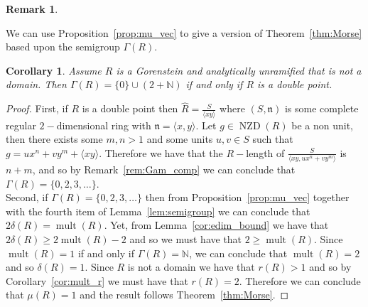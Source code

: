 \documentclass{article}
\newtheorem{remark}[theorem]{Remark}
\newtheorem{corollary}[theorem]{Corollary}
\DeclareMathOperator{\NZD}{NZD}
\DeclareMathOperator{\mult}{mult}
\numberwithin{theorem}{section}
\begin{document}
\begin{remark}
\end{remark}

We can use Proposition~\ref{prop:mu_vec} to give a version of Theorem~\ref{thm:Morse} based upon the semigroup $\Gamma(R)$. 

\begin{corollary}\label{cor:A_1_Gamma}
    Assume $R$ is a Gorenstein and analytically unramified that is not a domain. Then $\Gamma(R) = \{0\} \cup (2 + \mathbb{N})$ if and only if $R$ is a double point.
\end{corollary}

\begin{proof}
    First, if $R$ is a double point then $\hat{R} = \frac{S}{\langle xy \rangle}$ where $(S, \mathfrak{n})$ is some complete regular $2-$dimensional ring with $\mathfrak{n}=\langle x,y \rangle$. Let $g \in \NZD(R)$ be a non unit, then there exists some $m,n > 1$ and some units $u,v \in S$ such that $g=ux^n+vy^m + \langle xy \rangle$. Therefore we have that the $R-$length of $\frac{S}{\langle xy, ux^n+vy^m \rangle}$ is $n+m$, and so by Remark~\ref{rem:Gam_comp} we can conclude that $\Gamma(R) = \{0, 2, 3, \dots \}$. \\

    Second, if $\Gamma(R) = \{0, 2,3, \dots\}$ then from Proposition~\ref{prop:mu_vec} together with the fourth item of Lemma~\ref{lem:semigroup} we can conclude that $2\delta(R)=\mult(R)$. Yet, from Lemma~\ref{cor:edim_bound} we have that $2\delta(R) \geq 2\mult(R)-2$ and so we must have that $2 \geq \mult(R)$. Since $\mult(R)=1$ if and only if $\Gamma(R)=\mathbb{N}$, we can conclude that $\mult(R)=2$ and so $\delta(R)=1$. Since $R$ is not a domain we have that $r(R)>1$ and so by Corollary~\ref{cor:mult_r} we must have that $r(R)=2$. Therefore we can conclude that $\mu(R)=1$ and the result follows Theorem~\ref{thm:Morse}.
\end{proof}
\end{document}
